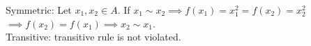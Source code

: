 Symmetric: Let $x_1,x_2\in A$. If $x_1\sim x_2 \implies f(x_1)=x_1^2=f(x_2)=x_2^2$\\
$\implies f(x_2)=f(x_1) \implies x_2 \sim x_1$.\\
Transitive: transitive rule is not violated.\\
